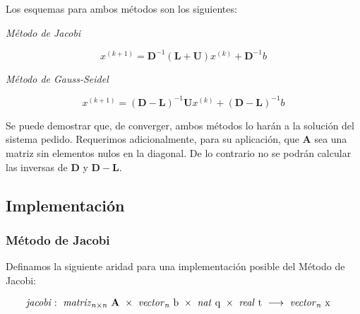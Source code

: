 \vspace{1em}
\noindent Los esquemas para ambos métodos son los siguientes:

\vspace{1em}
\begin{center}
    \textit{Método de Jacobi}
\end{center}

\begin{equation} \label{jacobi}
    x^{(k+1)} = \textbf{D}^{-1} (\textbf{L} + \textbf{U}) x^{(k)} + \textbf{D}^{-1} b 
\end{equation}

\vspace{2em}
\begin{center}
    \textit{Método de Gauss-Seidel}
\end{center}

\begin{equation}\label{gauss-seidel}
    x^{(k+1)} = (\mathbf{D} - \mathbf{L})^{-1} \mathbf{U} x^{(k)} + (\mathbf{D} - \mathbf{L})^{-1} b
\end{equation}

\vspace{1em}
Se puede demostrar que, de converger, ambos métodos lo harán a la solución del sistema pedido. Requerimos adicionalmente, para su aplicación, que $\mathbf{A}$ sea una matriz sin elementos nulos en la diagonal. De lo contrario no se podrán calcular las inversas de $\mathbf{D}$ y $\mathbf{D} - \mathbf{L}$.






\vspace{2em}
\subsection{Implementación}

\vspace{2em}
\subsubsection{Método de Jacobi}
Definamos la siguiente aridad para una implementación posible del Método de Jacobi:

\begin{align*}
    \text{\textit{jacobi}}&:\ \text{\textit{matriz}}_{n \times n}\ \mathbf{A}\ \times\ \text{\textit{vector}}_n\ \text{b}\ \times\ \text{\textit{nat} q}\ \times\ \text{\textit{real} t}\
    \longrightarrow\ \text{\textit{vector}}_n\ \text{x}
\end{align*}

